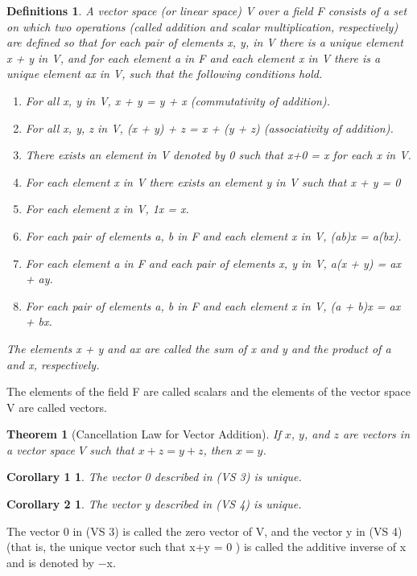\documentclass{article}
\theoremstyle{plain}
\newtheorem{theorem}{Theorem}[section]
\newtheorem*{corollary1}{Corollary 1}
\newtheorem*{corollary2}{Corollary 2}
\newtheorem*{definitions}{Definitions}
\theoremstyle{plain} %
\begin{document}
\begin{definitions}
A vector space (or linear space) V over a field F consists of a set on which two operations (called addition and scalar multiplication, respectively) are defined so that for each pair of elements x, y, in V there is a unique element x + y in V, and for each element a in F and each element x in V there is a unique element ax in V, such that the following conditions hold.
\begin{enumerate}[label=(VS~\arabic*)]
\item For all x, y in V, x + y = y + x (commutativity of addition).
\item For all x, y, z in V, (x + y) + z = x + (y + z) (associativity of addition).
\item There exists an element in V denoted by 0 such that x+0 = x for each x in V.
\item For each element x in V there exists an element y in V such that x + y = 0
\item For each element x in V, 1x = x.
\item For each pair of elements a, b in F and each element x in V, (ab)x = a(bx).
\item For each element a in F and each pair of elements x, y in V, a(x + y) = ax + ay.
\item For each pair of elements a, b in F and each element x in V, (a + b)x = ax + bx.
\end{enumerate}
The elements x + y and ax are called the sum of x and y and the product of a and x, respectively.
\end{definitions}

The elements of the field F are called scalars and the elements of the vector space V are called vectors.

\begin{theorem}[Cancellation Law for Vector Addition]
If $x$, $y$, and $z$ are vectors in a vector space $V$ such that $x + z = y + z$, then $x = y$.
\end{theorem}

\begin{corollary1}
The vector 0 described in (VS 3) is unique.
\end{corollary1}

\begin{corollary2}
The vector y described in (VS 4) is unique.
\end{corollary2}

The vector 0 in (VS 3) is called the zero vector of V, and the vector y in
(VS 4) (that is, the unique vector such that x+y = 0 ) is called the additive
inverse of x and is denoted by −x.
\end{document}
